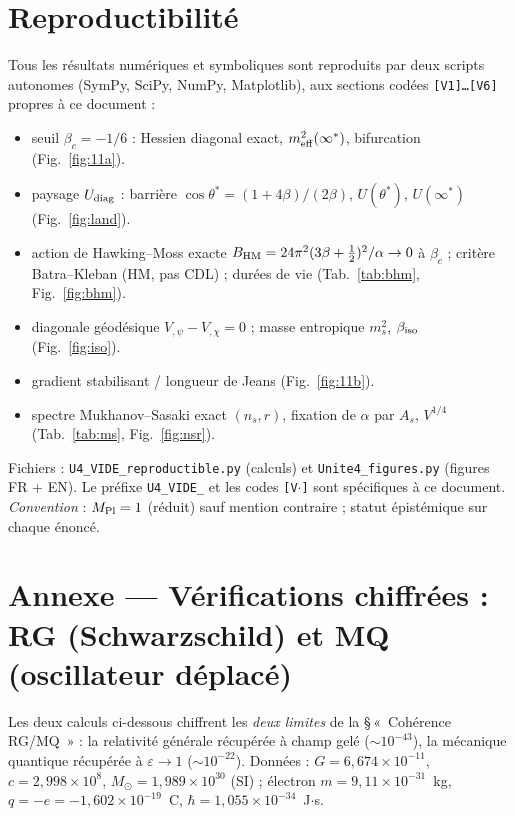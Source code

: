 \documentclass[11pt,a4paper]{article}
\newcommand{\Mpl}{M_{\rm Pl}}
\newcommand{\fpole}{\infty^*}
\begin{document}
\section*{Reproductibilité}
Tous les résultats numériques et symboliques sont reproduits par deux scripts autonomes (SymPy, SciPy, NumPy, Matplotlib), aux sections codées \texttt{[V1]\dots[V6]} propres à ce document :
\begin{itemize}[leftmargin=1.4em,itemsep=0pt]
\item[\texttt{[V1]}] seuil $\beta_c=-1/6$ : Hessien diagonal exact, $m^2_{\rm eff}(\fpole)$, bifurcation (Fig.~\ref{fig:11a}).
\item[\texttt{[V2]}] paysage $U_{\rm diag}$ : barrière $\cos\theta^*=(1+4\beta)/(2\beta)$, $U(\theta^*)$, $U(\fpole)$ (Fig.~\ref{fig:land}).
\item[\texttt{[V3]}] action de Hawking–Moss exacte $B_{\rm HM}=24\pi^2(3\beta+\tfrac12)^2/\alpha\to0$ à $\beta_c$ ; critère Batra–Kleban (HM, pas CDL) ; durées de vie (Tab.~\ref{tab:bhm}, Fig.~\ref{fig:bhm}).
\item[\texttt{[V4]}] diagonale géodésique $V_{,\psi}-V_{,\chi}=0$ ; masse entropique $m^2_s$, $\beta_{\rm iso}$ (Fig.~\ref{fig:iso}).
\item[\texttt{[V5]}] gradient stabilisant / longueur de Jeans (Fig.~\ref{fig:11b}).
\item[\texttt{[V6]}] spectre Mukhanov–Sasaki exact $(n_s,r)$, fixation de $\alpha$ par $A_s$, $V^{1/4}$ (Tab.~\ref{tab:ms}, Fig.~\ref{fig:nsr}).
\end{itemize}
Fichiers : \texttt{U4\_VIDE\_reproductible.py} (calculs) et \texttt{Unite4\_figures.py} (figures FR + EN). Le préfixe \texttt{U4\_VIDE\_} et les codes \texttt{[V$\cdot$]} sont spécifiques à ce document. \emph{Convention} : $\Mpl=1$ (réduit) sauf mention contraire ; statut épistémique sur chaque énoncé.

\section*{Annexe --- Vérifications chiffrées : RG (Schwarzschild) et MQ (oscillateur déplacé)}
\small
Les deux calculs ci-dessous chiffrent les \emph{deux limites} de la \S\,«~Cohérence RG/MQ~» : la relativité générale récupérée à champ gelé ($\sim10^{-43}$), la mécanique quantique récupérée à $\varepsilon\to1$ ($\sim10^{-22}$). Données : $G=6{,}674\times10^{-11}$, $c=2{,}998\times10^{8}$, $M_\odot=1{,}989\times10^{30}$ (SI) ; électron $m=9{,}11\times10^{-31}$~kg, $q=-e=-1{,}602\times10^{-19}$~C, $\hbar=1{,}055\times10^{-34}$~J$\cdot$s.
\end{document}
